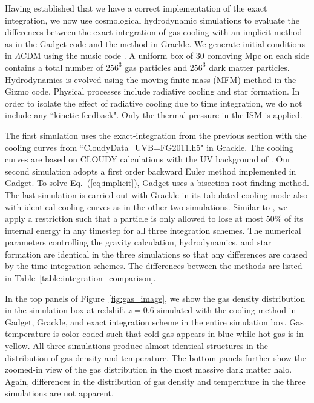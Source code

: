 \documentclass[a4paper,fleqn,usenatbib,useAMS, twocolumn]{mnras}
\begin{document}
Having established that we have a correct implementation of the exact integration, we now
use cosmological hydrodynamic simulations to evaluate the differences between the exact 
integration of gas cooling with an implicit method as in the {\sc Gadget} code and the method 
in {\sc Grackle}. We generate initial conditions in $\Lambda$CDM using the {\sc music} code
\citep{Hahn2011}. A uniform box of $30$ comoving Mpc on each side contains a total number of
$256^3$ gas particles and $256^3$ dark matter particles. Hydrodynamics is evolved using the
moving-finite-mass (MFM) method in the {\sc Gizmo} code. Physical processes include radiative 
cooling and star formation. In order to isolate the effect of radiative cooling due to time integration, 
we do not include any ``kinetic feedback". Only the thermal pressure in the ISM 
\citep{Springel2003} is applied. 

The first simulation uses the exact-integration from the previous section with the cooling curves 
from ``CloudyData\_UVB=FG2011.h5" in {\sc Grackle}. The cooling curves are based on 
{\sc CLOUDY} calculations with the UV background of \cite{Faucher2010}. Our second simulation
adopts a first order backward Euler method implemented in {\sc Gadget}. To solve 
Eq.~(\ref{eq:implicit}), {\sc Gadget} uses a bisection root finding method. The last simulation is 
carried out with {\sc Grackle} in its tabulated cooling mode also with identical cooling curves 
as in the other two simulations. Similar to \cite{Springel2001}, we
apply a restriction such that a particle is only allowed to lose at most 50\% of its internal energy 
in any timestep for all three integration schemes. The numerical parameters controlling the 
gravity calculation, hydrodynamics, and star formation are identical in the three simulations so that any 
differences are caused by the time integration schemes. The differences between the 
methods are listed in Table~\ref{table:integration_comparison}.

In the top panels of Figure~\ref{fig:gas_image}, we show the gas density distribution in the 
simulation box at redshift $z = 0.6$  simulated with the cooling method in {\sc Gadget}, 
{\sc Grackle}, and exact integration scheme in the entire simulation box. Gas temperature 
is color-coded such that cold gas appears in blue while hot gas is in yellow. All 
three simulations produce almost identical structures in the distribution of gas density and
temperature. The bottom panels further show the zoomed-in view of the gas distribution in 
the most massive dark matter halo. Again, differences in the distribution of gas density 
and temperature in the three simulations are not apparent.
\end{document}
